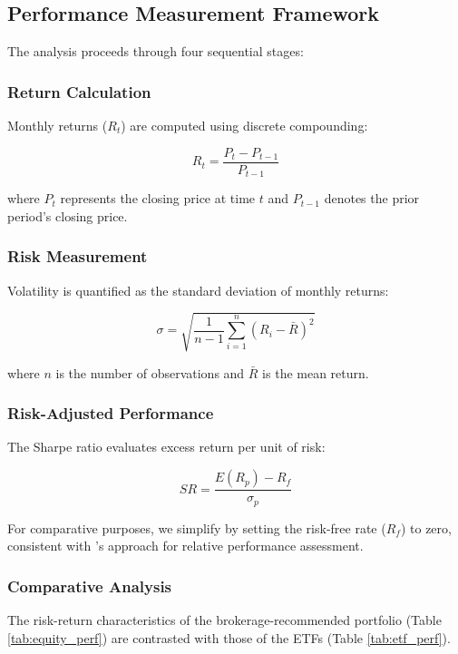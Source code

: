 \documentclass{article}
\begin{document}
\subsection{Performance Measurement Framework}
The analysis proceeds through four sequential stages:

\subsubsection{Return Calculation}
Monthly returns ($R_t$) are computed using discrete compounding:

\begin{equation}
    R_t = \frac{P_t - P_{t-1}}{P_{t-1}}
\end{equation}

where $P_t$ represents the closing price at time $t$ and $P_{t-1}$ denotes the prior period's closing price.

\subsubsection{Risk Measurement}
Volatility is quantified as the standard deviation of monthly returns:

\begin{equation}
    \sigma = \sqrt{\frac{1}{n-1}\sum_{i=1}^n (R_i - \bar{R})^2}
\end{equation}

where $n$ is the number of observations and $\bar{R}$ is the mean return.

\subsubsection{Risk-Adjusted Performance}
The Sharpe ratio evaluates excess return per unit of risk:

\begin{equation}
    SR = \frac{E(R_p) - R_f}{\sigma_p}
\end{equation}

For comparative purposes, we simplify by setting the risk-free rate ($R_f$) to zero, consistent with \citet{Elton_2014}'s approach for relative performance assessment.

\subsubsection{Comparative Analysis}
The risk-return characteristics of the brokerage-recommended portfolio (Table \ref{tab:equity_perf}) are contrasted with those of the ETFs (Table \ref{tab:etf_perf}).
\end{document}
